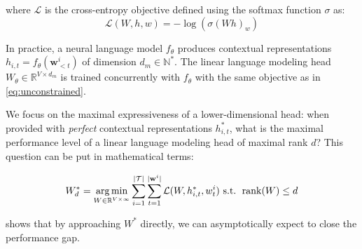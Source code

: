 where $\mathcal{L}$ is the cross-entropy objective defined using the softmax function $\sigma$ as:
$$
\mathcal{L}(W, h, w) = - \log (\sigma(Wh)_{w})
$$


In practice, a neural language model $f_\theta$ produces contextual representations $h_{i,t} = f_\theta(\mathbf{w}^i_{<t})$ of dimension $d_m \in \mathbb{N}^*$. The linear language modeling head $W_\theta \in \mathbb{R}^{V \times d_m}$ is trained concurrently with $f_\theta$ with the same objective as in \autoref{eq:unconstrained}.

We focus on the maximal expressiveness of a lower-dimensional head: when provided with \textit{perfect} contextual representations $h^*_{i,t}$, what is the maximal performance level of a linear language modeling head of maximal rank $d$? This question can be put in mathematical terms:

\begin{equation}
W_d^* = \operatorname*{arg\,min}_{W \in \mathbb{R}^{V \times \infty}} \sum_{i=1}^{|\mathcal{T}|} \sum_{t=1}^{|\mathbf{w}^i|} \mathcal{L}(W, h^*_{i,t}, w^i_t) \text{ s.t. } \operatorname{rank}(W) \leq d
\label{eq:constrained}
\end{equation}





 shows that by approaching $W^*$ directly, we can asymptotically expect to close the performance gap.

